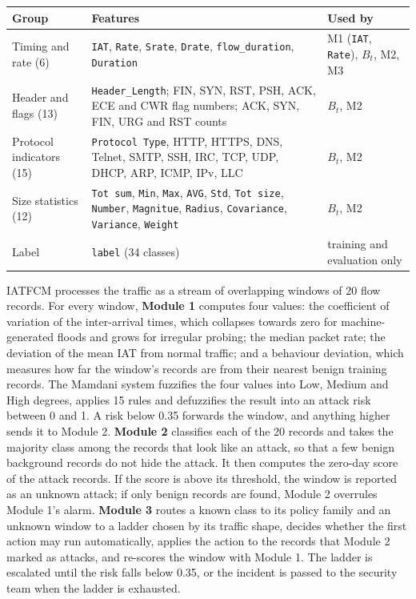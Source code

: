 \documentclass[]{interact}
\theoremstyle{plain}
\theoremstyle{definition}
\newcommand{\unhead}[1]{\par\vspace{8pt}\noindent{\normalsize\bfseries #1}\par\vspace{4pt}\noindent}
\begin{document}
\begin{table}[htbp]
{\small
\begin{tabular}{p{2.6cm}p{7.6cm}p{2.6cm}}
\toprule
Group & Features & Used by \\
\midrule
Timing and rate (6) & \texttt{IAT}, \texttt{Rate}, \texttt{Srate}, \texttt{Drate}, \texttt{flow\_duration}, \texttt{Duration} & M1 (\texttt{IAT}, \texttt{Rate}), $B_t$, M2, M3 \\
Header and flags (13) & \texttt{Header\_Length}; FIN, SYN, RST, PSH, ACK, ECE and CWR flag numbers; ACK, SYN, FIN, URG and RST counts & $B_t$, M2 \\
Protocol indicators (15) & \texttt{Protocol Type}, HTTP, HTTPS, DNS, Telnet, SMTP, SSH, IRC, TCP, UDP, DHCP, ARP, ICMP, IPv, LLC & $B_t$, M2 \\
Size statistics (12) & \texttt{Tot sum}, \texttt{Min}, \texttt{Max}, \texttt{AVG}, \texttt{Std}, \texttt{Tot size}, \texttt{Number}, \texttt{Magnitue}, \texttt{Radius}, \texttt{Covariance}, \texttt{Variance}, \texttt{Weight} & $B_t$, M2 \\
Label & \texttt{label} (34 classes) & training and evaluation only \\
\bottomrule
\end{tabular}}
\label{tab:features}
\end{table}

\unhead{Working of the modules in brief}
IATFCM processes the traffic as a stream of overlapping windows of 20 flow records. For every window, \textbf{Module 1} computes four values: the coefficient of variation of the inter-arrival times, which collapses towards zero for machine-generated floods and grows for irregular probing; the median packet rate; the deviation of the mean IAT from normal traffic; and a behaviour deviation, which measures how far the window's records are from their nearest benign training records. The Mamdani system fuzzifies the four values into Low, Medium and High degrees, applies 15 rules and defuzzifies the result into an attack risk between 0 and 1. A risk below 0.35 forwards the window, and anything higher sends it to Module 2. \textbf{Module 2} classifies each of the 20 records and takes the majority class among the records that look like an attack, so that a few benign background records do not hide the attack. It then computes the zero-day score of the attack records. If the score is above its threshold, the window is reported as an unknown attack; if only benign records are found, Module 2 overrules Module 1's alarm. \textbf{Module 3} routes a known class to its policy family and an unknown window to a ladder chosen by its traffic shape, decides whether the first action may run automatically, applies the action to the records that Module 2 marked as attacks, and re-scores the window with Module 1. The ladder is escalated until the risk falls below 0.35, or the incident is passed to the security team when the ladder is exhausted.
\end{document}
